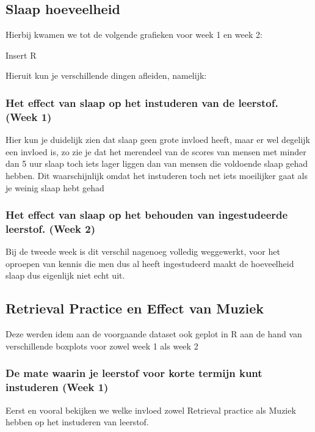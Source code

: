 \documentclass{hogent-article}
\begin{document}
\subsection{Slaap hoeveelheid}

Hierbij kwamen we tot de volgende grafieken voor week 1 en week 2:

Insert R


Hieruit kun je verschillende dingen afleiden, namelijk:

\subsubsection{Het effect van slaap op het instuderen van de leerstof. (Week 1)}

Hier kun je duidelijk zien dat slaap geen grote invloed heeft, maar er wel degelijk een invloed is, zo zie je dat het merendeel van de scores van mensen met minder dan 5 uur slaap toch iets lager liggen dan van mensen die voldoende slaap gehad hebben. Dit waarschijnlijk omdat het instuderen toch net iets moeilijker gaat als je weinig slaap hebt gehad

\subsubsection{Het effect van slaap op het behouden van ingestudeerde leerstof. (Week 2)}

Bij de tweede week is dit verschil nagenoeg volledig weggewerkt, voor het oproepen van kennis die men dus al heeft ingestudeerd maakt de hoeveelheid slaap dus eigenlijk niet echt uit.

\subsection{Retrieval Practice en Effect van Muziek}

Deze werden idem aan de voorgaande dataset ook geplot in R aan de hand van verschillende boxplots voor zowel week 1 als week 2

\subsubsection{De mate waarin je leerstof voor korte termijn kunt instuderen (Week 1)}

Eerst en vooral bekijken we welke invloed zowel Retrieval practice als Muziek hebben op het instuderen van leerstof.
\end{document}
